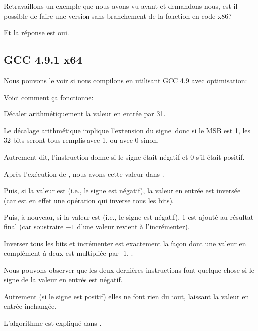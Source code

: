 \label{chap:branchless_abs}

Retravaillons un exemple que nous avons vu avant  et demandons-nous,
est-il possible de faire une version sans branchement de la fonction en code x86?



Et la réponse est oui.

\subsection{GCC 4.9.1 x64 \Optimizing}

Nous pouvons le voir si nous compilons en utilisant GCC 4.9 avec optimisation:



Voici comment ça fonctionne:

Décaler arithmétiquement la valeur en entrée par 31.

Le décalage arithmétique implique l'extension du signe, donc si le \ac{MSB} est 1,
les 32 bits seront tous remplis avec  1, ou avec 0 sinon.

Autrement dit, l'instruction  donne  si le signe
était négatif et 0 s'il était positif.

Après l'exécution de , nous avons cette valeur dans \EDX.

Puis, si la valeur est  (i.e., le signe est négatif), la valeur en
entrée est inversée (car  est en effet une opération qui
inverse tous les bits).

Puis, à nouveau, si la valeur est  (i.e., le signe est négatif), 1
est ajouté au résultat final (car soustraire $-1$ d'une valeur revient à l'incrémenter).

Inverser tous les bits et incrémenter est exactement la façon dont une valeur en
complément à deux est multipliée par -1.
.

Nous pouvons observer que les deux dernières instructions font quelque chose si le
signe de la valeur en entrée est négatif.

Autrement (si le signe est positif) elles ne font rien du tout, laissant la valeur
en entrée inchangée.

L'algorithme est expliqué dans .

